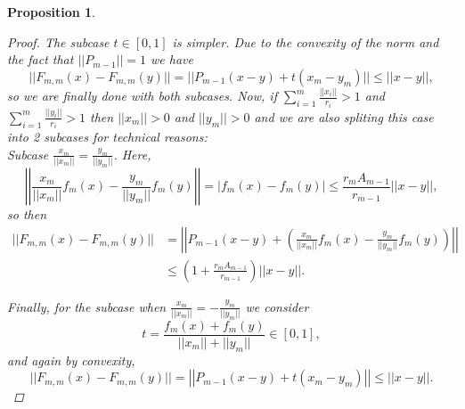 \documentclass[11pt]{amsart}
\newcommand{\<}{\langle}
\renewcommand{\>}{\rangle}
\newtheorem{prop}[theorem]{Proposition}
\theoremstyle{definition}
\theoremstyle{remark}
\numberwithin{equation}{section}
\begin{document}
\begin{prop}
\begin{proof}
The subcase $t\in[0,1]$  is simpler. Due to the convexity of the norm and the fact that $||P_{m-1}||=1$ we have
$$||F_{m,m}(x)-F_{m,m}(y)||=||P_{m-1}(x-y)+t(x_m-y_m)||\le||x-y||,$$
so we are finally done with both subcases. Now, if $\sum\limits_{i=1}^{m}\frac{||x_i||}{r_i}>1$ and $\sum\limits_{i=1}^{m}\frac{||y_i||}{r_i}>1$ then $||x_m||>0$ and $||y_m||>0$ and we are also spliting this case into 2 subcases for technical reasons: \\

Subcase $\frac{x_m}{||x_m||}=\frac{y_m}{||y_m||}$. Here,
$$\left|\left|\frac{x_m}{||x_m||}f_m(x)-\frac{y_m}{||y_m||}f_m(y)\right|\right|=|f_m(x)-f_m(y)|\le\frac{r_mA_{m-1}}{r_{m-1}}||x-y||,$$
so then
$$\begin{aligned}||F_{m,m}(x)-F_{m,m}(y)||&=\left|\left|P_{m-1}(x-y)+\left(\frac{x_m}{||x_m||}f_m(x)-\frac{y_m}{||y_m||}f_m(y)\right)\right|\right|\\
&\le \left(1+\frac{r_mA_{m-1}}{r_{m-1}}\right)||x-y||.\end{aligned}$$

Finally, for the subcase when $\frac{x_m}{||x_m||}=-\frac{y_m}{||y_m||}$ we consider
$$t=\frac{f_m(x)+f_m(y)}{||x_m||+||y_m||}\in[0,1],$$
and again by convexity,
$$||F_{m,m}(x)-F_{m,m}(y)||=\left|\left|P_{m-1}(x-y)+t(x_m-y_m)\right|\right|\le||x-y||.$$
\end{proof}
\end{prop}
\end{document}
